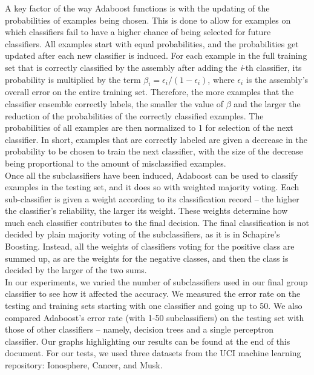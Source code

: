 \documentclass{article}
\begin{document}
A key factor of the way Adaboost functions is with the updating of the probabilities of examples being chosen. This is done to allow for examples on which classifiers fail to have a higher chance of being selected for future classifiers. All examples start with equal probabilities, and the probabilities get updated after each new classifier is induced. For each example in the full training set that is correctly classified by the assembly after adding the \textit{i}-th classifier, its probability is multiplied by the term $\beta_i = \epsilon_i / (1 - \epsilon_i)$, where $\epsilon_i$ is the assembly's overall error on the entire training set. Therefore, the more examples that the classifier ensemble correctly labels, the smaller the value of $\beta$ and the larger the reduction of the probabilities of the correctly classified examples. The probabilities of all examples are then normalized to 1 for selection of the next classifier. In short, examples that are correctly labeled are given a decrease in the probability to be chosen to train the next classifier, with the size of the decrease being proportional to the amount of misclassified examples. \\

Once all the subclassifiers have been induced, Adaboost can be used to classify examples in the testing set, and it does so with weighted majority voting. Each sub-classifier is given a weight according to its classification record -- the higher the classifier's reliability, the larger its weight. These weights determine how much each classifier contributes to the final decision. The final classification is not decided by plain majority voting of the subclassifiers, as it is in Schapire's Boosting. Instead, all the weights of classifiers voting for the positive class are summed up, as are the weights for the negative classes, and then the class is decided by the larger of the two sums. \\

In our experiments, we varied the number of subclassifiers used in our final group classifier to see how it affected the accuracy. We measured the error rate on the testing and training sets starting with one classifier and going up to 50. We also compared Adaboost's error rate (with 1-50 subclassifiers) on the testing set with those of other classifiers -- namely, decision trees and a single perceptron classifier. Our graphs highlighting our results can be found at the end of this document. For our tests, we used three datasets from the UCI machine learning repository: Ionosphere, Cancer, and Musk.
\end{document}
